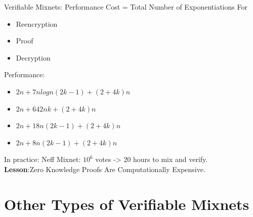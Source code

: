 \documentclass{beamer}
\begin{document}
\begin{frame}{Verifiable Mixnets: Performance}
Cost = Total Number of Exponentiations For
\begin{itemize}
\item Reencryption
\item Proof
\item Decryption
\end{itemize}
Performance:
\begin{itemize}
\item \cite{JJ99} $2n + 7nlogn(2k-1) + (2+4k)n$
\item \cite{SK95} $2n + 642nk + (2+4k)n$
\item \cite{FS01} $2n + 18n(2k-1) + (2+4k)n$
\item \cite{Neff01} $2n + 8n(2k-1) + (2+4k)n$
\end{itemize}
In practice: Neff Mixnet: $10^6$ votes -> $20$ hours to mix and verify. \\
\textbf{Lesson}:Zero Knowledge Proofs Are Computationally Expensive.
\end{frame}

\section{Other Types of Verifiable Mixnets}
\end{document}
